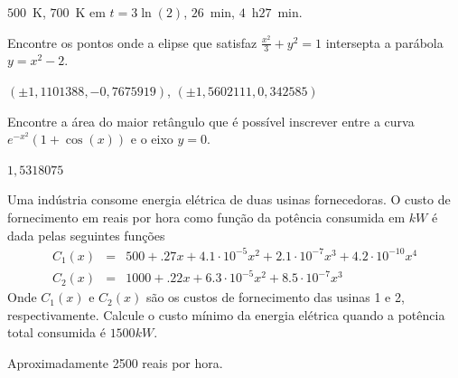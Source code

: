 \begin{Answer}
  \begin{tiny}
$500$~K, $700$~K em $t=3\ln(2)$, $26$~min, $4$~h$27$~min.    
  \end{tiny}
\end{Answer}

\begin{Exercise} Encontre os pontos onde a elipse que satisfaz $\frac{x^2}{3}+y^2=1$ intersepta a parábola $y=x^2-2$.
\end{Exercise}
\begin{Answer}
  \begin{tiny}
$\left(\pm 1,1101388, -0,7675919\right)$, $\left(\pm 1,5602111, 0,342585\right)$
  \end{tiny}
\end{Answer}

\begin{Exercise}[title= Otimização] Encontre a área do maior retângulo que é possível inscrever entre a curva $e^{-x^2}\left(1+\cos(x)\right)$ e o eixo $y=0$.
\end{Exercise}
\begin{Answer}
  \begin{tiny}
$1,5318075$
  \end{tiny}
\end{Answer}


\begin{Exercise}[title=Otimização] \label{usinas} Uma indústria consome energia elétrica de duas usinas fornecedoras. O custo de fornecimento em reais por hora como função da potência consumida em $kW$ é dada pelas seguintes funções
\begin{eqnarray*}
C_1(x)&=& 500+.27 x + 4.1\cdot 10^{-5}x^2 +2.1\cdot 10^{-7}x^3+4.2\cdot 10^{-10}x^4 \\
C_2(x)&=& 1000+.22 x + 6.3\cdot 10^{-5}x^2 +8.5\cdot 10^{-7}x^3
\end{eqnarray*}
Onde $C_1(x)$ e $C_2(x)$ são os custos de fornecimento das usinas 1 e 2, respectivamente. Calcule o custo mínimo da energia elétrica quando a potência total consumida é  $1500kW$.

\end{Exercise}
\begin{Answer}
  \begin{tiny}
 Aproximadamente 2500 reais por hora.    
  \end{tiny}
\end{Answer}

